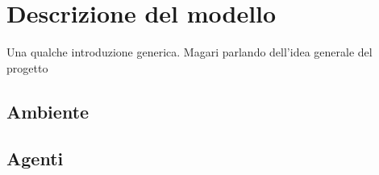 \chapter{Descrizione del modello}
\label{chap:modeldesc}
Una qualche introduzione generica. Magari parlando dell'idea generale del progetto
\section{Ambiente}
\label{sec:environment}

\section{Agenti}
\label{sec:agents}
